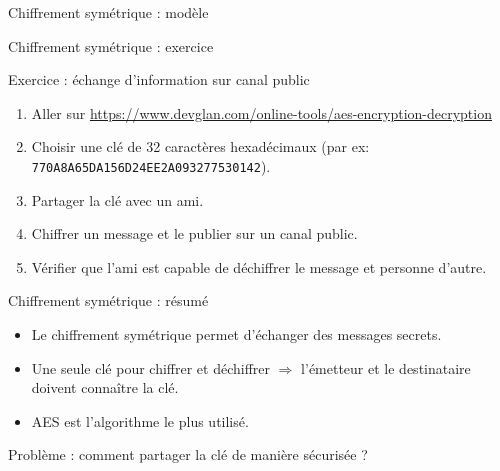 \begin{frame}{Chiffrement symétrique : modèle}
  
\end{frame}

\begin{frame}{Chiffrement symétrique : exercice}
  \begin{block}{Exercice : échange d'information sur canal public}
    \begin{enumerate}
      \item Aller sur \url{https://www.devglan.com/online-tools/aes-encryption-decryption}
      \item Choisir une clé de 32 caractères hexadécimaux (par ex: \texttt{770A8A65DA156D24EE2A093277530142}).
      \item Partager la clé avec un ami.
      \item Chiffrer un message et le publier sur un canal public.
      \item Vérifier que l'ami est capable de déchiffrer le message et personne d'autre.
    \end{enumerate}
  \end{block}
\end{frame}

\begin{frame}{Chiffrement symétrique : résumé}
  \begin{itemize}
    \item Le chiffrement symétrique permet d'échanger des messages secrets.
    \item Une seule clé pour chiffrer et déchiffrer $\Rightarrow$ l'émetteur et le destinataire doivent connaître la clé.
    \item AES est l'algorithme le plus utilisé.
  \end{itemize}

  Problème : comment partager la clé de manière sécurisée ?
\end{frame}